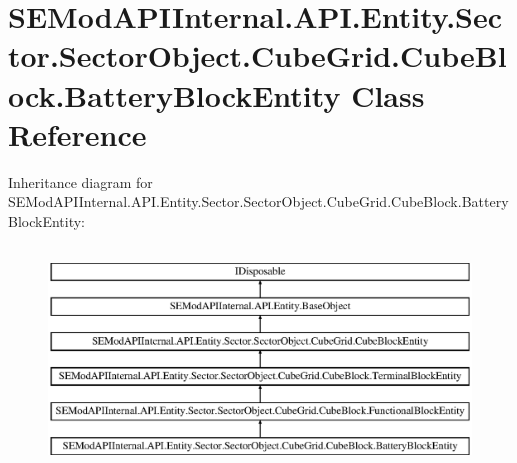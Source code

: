 \hypertarget{class_s_e_mod_a_p_i_internal_1_1_a_p_i_1_1_entity_1_1_sector_1_1_sector_object_1_1_cube_grid_1_1e3ae28049e4cb2ea762f188fbd81d368}{}\section{S\+E\+Mod\+A\+P\+I\+Internal.\+A\+P\+I.\+Entity.\+Sector.\+Sector\+Object.\+Cube\+Grid.\+Cube\+Block.\+Battery\+Block\+Entity Class Reference}
\label{class_s_e_mod_a_p_i_internal_1_1_a_p_i_1_1_entity_1_1_sector_1_1_sector_object_1_1_cube_grid_1_1e3ae28049e4cb2ea762f188fbd81d368}
Inheritance diagram for S\+E\+Mod\+A\+P\+I\+Internal.\+A\+P\+I.\+Entity.\+Sector.\+Sector\+Object.\+Cube\+Grid.\+Cube\+Block.\+Battery\+Block\+Entity\+:\begin{figure}[H]
\begin{center}
\leavevmode
\includegraphics[height=6.000000cm]{class_s_e_mod_a_p_i_internal_1_1_a_p_i_1_1_entity_1_1_sector_1_1_sector_object_1_1_cube_grid_1_1e3ae28049e4cb2ea762f188fbd81d368}
\end{center}
\end{figure}

